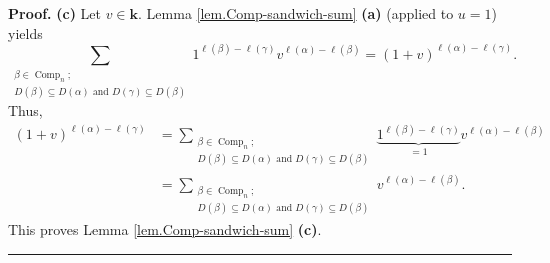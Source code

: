 \documentclass[numbers=enddot,12pt,final,onecolumn,notitlepage]{scrartcl}%
\theoremstyle{definition}
\newenvironment{proof}[1][Proof]{\noindent\textbf{#1.} }{\ \rule{0.5em}{0.5em}}
\let\sumnonlimits\sum
\renewcommand{\sum}{\sumnonlimits\limits}
\newenvironment{verlong}{}{}
\begin{document}
\begin{verlong}
\begin{proof}
\textbf{(c)} Let $v\in\mathbf{k}$. Lemma \ref{lem.Comp-sandwich-sum}
\textbf{(a)} (applied to $u=1$) yields%
\[
\sum_{\substack{\beta\in\operatorname*{Comp}\nolimits_{n};\\D\left(
\beta\right)  \subseteq D\left(  \alpha\right)  \text{ and }D\left(
\gamma\right)  \subseteq D\left(  \beta\right)  }}1^{\ell\left(  \beta\right)
-\ell\left(  \gamma\right)  }v^{\ell\left(  \alpha\right)  -\ell\left(
\beta\right)  }=\left(  1+v\right)  ^{\ell\left(  \alpha\right)  -\ell\left(
\gamma\right)  }.
\]
Thus,%
\begin{align*}
\left(  1+v\right)  ^{\ell\left(  \alpha\right)  -\ell\left(  \gamma\right)
}  &  =\sum_{\substack{\beta\in\operatorname*{Comp}\nolimits_{n};\\D\left(
\beta\right)  \subseteq D\left(  \alpha\right)  \text{ and }D\left(
\gamma\right)  \subseteq D\left(  \beta\right)  }}\underbrace{1^{\ell\left(
\beta\right)  -\ell\left(  \gamma\right)  }}_{=1}v^{\ell\left(  \alpha\right)
-\ell\left(  \beta\right)  }\\
&  =\sum_{\substack{\beta\in\operatorname*{Comp}\nolimits_{n};\\D\left(
\beta\right)  \subseteq D\left(  \alpha\right)  \text{ and }D\left(
\gamma\right)  \subseteq D\left(  \beta\right)  }}v^{\ell\left(
\alpha\right)  -\ell\left(  \beta\right)  }.
\end{align*}
This proves Lemma \ref{lem.Comp-sandwich-sum} \textbf{(c)}.
\end{proof}
\end{verlong}
\end{document}
